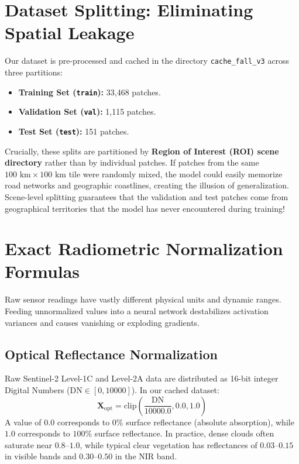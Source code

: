 \section{Dataset Splitting: Eliminating Spatial Leakage}
Our dataset is pre-processed and cached in the directory \texttt{cache\_fall\_v3} across three partitions:
\begin{itemize}
    \item \textbf{Training Set (\texttt{train}):} 33,468 patches.
    \item \textbf{Validation Set (\texttt{val}):} 1,115 patches.
    \item \textbf{Test Set (\texttt{test}):} 151 patches.
\end{itemize}
Crucially, these splits are partitioned by \textbf{Region of Interest (ROI) scene directory} rather than by individual patches. If patches from the same $100\text{ km} \times 100\text{ km}$ tile were randomly mixed, the model could easily memorize road networks and geographic coastlines, creating the illusion of generalization. Scene-level splitting guarantees that the validation and test patches come from geographical territories that the model has never encountered during training!

\section{Exact Radiometric Normalization Formulas}
Raw sensor readings have vastly different physical units and dynamic ranges. Feeding unnormalized values into a neural network destabilizes activation variances and causes vanishing or exploding gradients.

\subsection{Optical Reflectance Normalization}
Raw Sentinel-2 Level-1C and Level-2A data are distributed as 16-bit integer Digital Numbers ($\text{DN} \in [0, 10000]$). In our cached dataset:
\begin{equation}
\mathbf{X}_{\text{opt}} = \text{clip}\left(\frac{\text{DN}}{10000.0}, 0.0, 1.0\right)
\end{equation}
A value of $0.0$ corresponds to $0\%$ surface reflectance (absolute absorption), while $1.0$ corresponds to $100\%$ surface reflectance. In practice, dense clouds often saturate near $0.8\text{--}1.0$, while typical clear vegetation has reflectances of $0.03\text{--}0.15$ in visible bands and $0.30\text{--}0.50$ in the NIR band.

